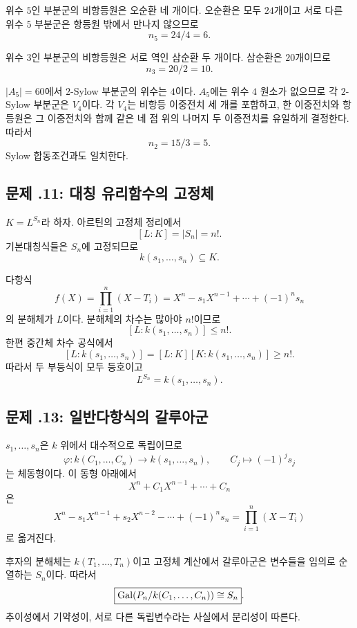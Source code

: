 \begin{solution}
위수 $5$인 부분군의 비항등원은 오순환 네 개이다. 오순환은 모두 $24$개이고 서로 다른 위수 $5$ 부분군은 항등원 밖에서 만나지 않으므로
\[
  n_5=24/4=6.
\]

위수 $3$인 부분군의 비항등원은 서로 역인 삼순환 두 개이다. 삼순환은 $20$개이므로
\[
  n_3=20/2=10.
\]

$|A_5|=60$에서 $2$-Sylow 부분군의 위수는 $4$이다. $A_5$에는 위수 $4$ 원소가 없으므로 각 $2$-Sylow 부분군은 $V_4$이다. 각 $V_4$는 비항등 이중전치 세 개를 포함하고, 한 이중전치와 항등원은 그 이중전치와 함께 같은 네 점 위의 나머지 두 이중전치를 유일하게 결정한다. 따라서
\[
  n_2=15/3=5.
\]
Sylow 합동조건과도 일치한다.
\end{solution}

\subsection*{문제 \thechapter.11: 대칭 유리함수의 고정체}

\begin{solution}
$K=L^{S_n}$라 하자. 아르틴의 고정체 정리에서
\[
  [L:K]=|S_n|=n!.
\]
기본대칭식들은 $S_n$에 고정되므로
\[
  k(s_1,\dots,s_n)\subseteq K.
\]

다항식
\[
  f(X)=\prod_{i=1}^n(X-T_i)
  =X^n-s_1X^{n-1}+\cdots+(-1)^ns_n
\]
의 분해체가 $L$이다. 분해체의 차수는 많아야 $n!$이므로
\[
  [L:k(s_1,\dots,s_n)]\le n!.
\]
한편 중간체 차수 공식에서
\[
  [L:k(s_1,\dots,s_n)]
  =[L:K][K:k(s_1,\dots,s_n)]
  \ge n!.
\]
따라서 두 부등식이 모두 등호이고
\[
  \boxed{L^{S_n}=k(s_1,\dots,s_n)}.
\]
\end{solution}

\subsection*{문제 \thechapter.13: 일반다항식의 갈루아군}

\begin{solution}
$s_1,\dots,s_n$은 $k$ 위에서 대수적으로 독립이므로
\[
  \varphi:k(C_1,\dots,C_n)
  \longrightarrow k(s_1,\dots,s_n),
  \qquad
  C_j\longmapsto(-1)^js_j
\]
는 체동형이다. 이 동형 아래에서
\[
  X^n+C_1X^{n-1}+\cdots+C_n
\]
은
\[
  X^n-s_1X^{n-1}+s_2X^{n-2}-\cdots+(-1)^ns_n
  =\prod_{i=1}^n(X-T_i)
\]
로 옮겨진다.

후자의 분해체는 $k(T_1,\dots,T_n)$이고 고정체 계산에서 갈루아군은 변수들을 임의로 순열하는 $S_n$이다. 따라서
\[
  \boxed{\operatorname{Gal}(P_n/k(C_1,\dots,C_n))\cong S_n}.
\]
추이성에서 기약성이, 서로 다른 독립변수라는 사실에서 분리성이 따른다.
\end{solution}

